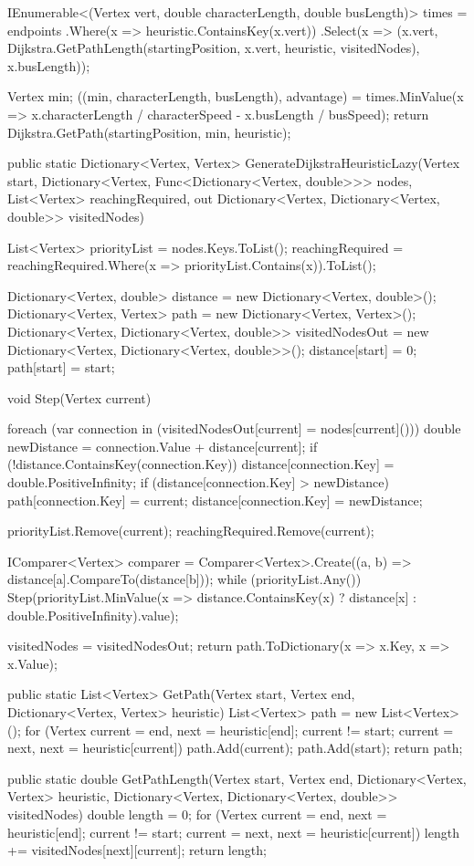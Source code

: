 \documentclass[12pt]{article}
\begin{document}
\begin{Csharp}[caption=class Map]
{    IEnumerable<(Vertex vert, double characterLength, double busLength)> times = endpoints
        .Where(x => heuristic.ContainsKey(x.vert))
        .Select(x => 
            (x.vert, Dijkstra.GetPathLength(startingPosition, x.vert, heuristic, visitedNodes), x.busLength));

    Vertex min;
    ((min, characterLength, busLength), advantage) = times.MinValue(x => x.characterLength / characterSpeed - x.busLength / busSpeed);
    return Dijkstra.GetPath(startingPosition, min, heuristic);
}
\end{Csharp}

\begin{Csharp}[caption=class Dijkstra]
public static Dictionary<Vertex, Vertex> GenerateDijkstraHeuristicLazy(Vertex start, Dictionary<Vertex, Func<Dictionary<Vertex, double>>> nodes, List<Vertex> reachingRequired, out Dictionary<Vertex, Dictionary<Vertex, double>> visitedNodes)
{
    List<Vertex> priorityList = nodes.Keys.ToList();
    reachingRequired = reachingRequired.Where(x => priorityList.Contains(x)).ToList();

    Dictionary<Vertex, double> distance = new Dictionary<Vertex, double>();
    Dictionary<Vertex, Vertex> path = new Dictionary<Vertex, Vertex>();
    Dictionary<Vertex, Dictionary<Vertex, double>> visitedNodesOut = new Dictionary<Vertex, Dictionary<Vertex, double>>();
    distance[start] = 0;
    path[start] = start;

    void Step(Vertex current)
    {
        foreach (var connection in (visitedNodesOut[current] = nodes[current]()))
        {
            double newDistance = connection.Value + distance[current];
            if (!distance.ContainsKey(connection.Key)) distance[connection.Key] = double.PositiveInfinity;
            if (distance[connection.Key] > newDistance)
            {
                path[connection.Key] = current;
                distance[connection.Key] = newDistance;
            }
        }

        priorityList.Remove(current);
        reachingRequired.Remove(current);
    }
    IComparer<Vertex> comparer = Comparer<Vertex>.Create((a, b) => distance[a].CompareTo(distance[b]));
    while (priorityList.Any()) Step(priorityList.MinValue(x => distance.ContainsKey(x) ? distance[x] : double.PositiveInfinity).value);

    visitedNodes = visitedNodesOut;
    return path.ToDictionary(x => x.Key, x => x.Value);
}

public static List<Vertex> GetPath(Vertex start, Vertex end, Dictionary<Vertex, Vertex> heuristic)
{
    List<Vertex> path = new List<Vertex>();
    for (Vertex current = end, next = heuristic[end]; current != start; current = next, next = heuristic[current]) path.Add(current);
    path.Add(start);
    return path;
}

public static double GetPathLength(Vertex start, Vertex end, Dictionary<Vertex, Vertex> heuristic, Dictionary<Vertex, Dictionary<Vertex, double>> visitedNodes)
{
    double length = 0;
    for (Vertex current = end, next = heuristic[end]; current != start; current = next, next = heuristic[current]) length += visitedNodes[next][current];
    return length;
}
\end{Csharp}
\end{document}
